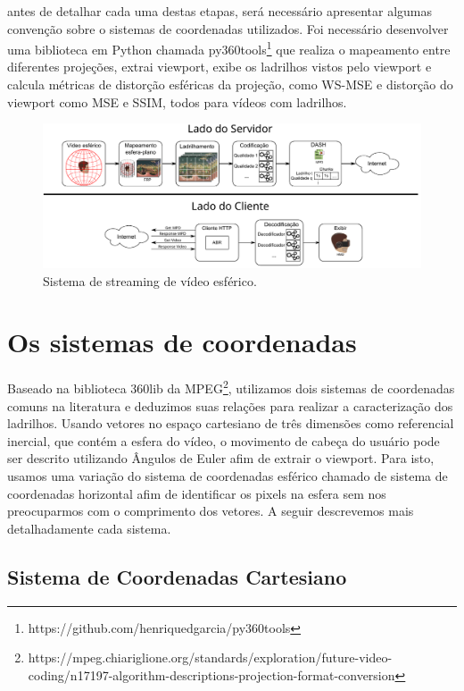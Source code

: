 antes de detalhar cada uma destas etapas, será necessário apresentar algumas convenção sobre o sistemas de coordenadas utilizados. Foi necessário desenvolver uma biblioteca em Python chamada py360tools\footnote{https://github.com/henriquedgarcia/py360tools} que realiza o mapeamento entre diferentes projeções, extrai viewport, exibe os ladrilhos vistos pelo viewport e calcula métricas de distorção esféricas da projeção, como WS-MSE e distorção do viewport como MSE e SSIM, todos para vídeos com ladrilhos.

\begin{figure}[h]
	\centering
	\includegraphics[width=0.9\linewidth]{"fig/Streaming - client-side and server-side.pdf"}
	\caption{Sistema de streaming de vídeo esférico.}
	\label{fig:streaming_client_server}
\end{figure}

\section{Os sistemas de coordenadas}

Baseado na biblioteca 360lib da MPEG\footnote{https://mpeg.chiariglione.org/standards/exploration/future-video-coding/n17197-algorithm-descriptions-projection-format-conversion}, utilizamos dois sistemas de coordenadas comuns na literatura e deduzimos suas relações para realizar a caracterização dos ladrilhos. Usando vetores no espaço cartesiano de três dimensões como referencial inercial, que contém a esfera do vídeo, o movimento de cabeça do usuário pode ser descrito utilizando Ângulos de Euler afim de extrair o viewport.  Para isto, usamos uma variação do sistema de coordenadas esférico chamado de sistema de coordenadas horizontal afim de identificar os pixels na esfera sem nos preocuparmos com o comprimento dos vetores. A seguir descrevemos mais detalhadamente cada sistema.

\subsection{Sistema de Coordenadas Cartesiano}


